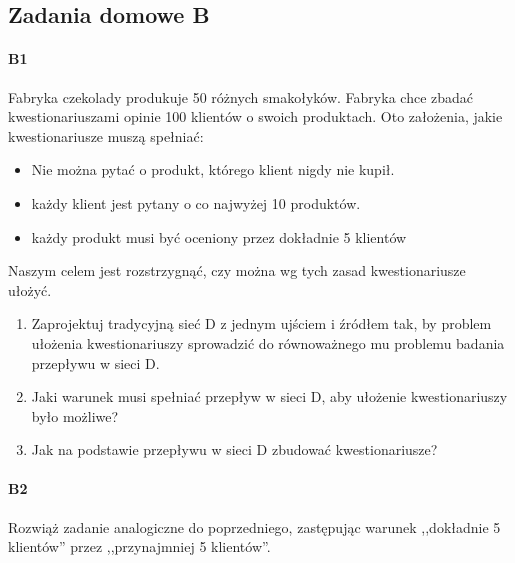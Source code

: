 \subsection{Zadania domowe B}
\paragraph{B1} Fabryka czekolady produkuje 50 różnych smakołyków. Fabryka chce zbadać kwestionariuszami opinie 100 klientów o swoich produktach. Oto założenia, jakie kwestionariusze muszą
spełniać:
\begin{itemize}
\item Nie można pytać o produkt, którego klient nigdy nie kupił.
\item każdy klient jest pytany o co najwyżej 10 produktów.
\item każdy produkt musi być oceniony przez dokładnie 5 klientów
\end{itemize}
Naszym celem jest rozstrzygnąć, czy można wg tych zasad kwestionariusze ułożyć.
\begin{enumerate}[label=\alph*)]
\item Zaprojektuj tradycyjną sieć D z jednym ujściem i źródłem tak, by problem ułożenia kwestionariuszy
sprowadzić do równoważnego mu problemu badania przepływu w sieci D.
\item Jaki warunek musi spełniać przepływ w sieci D, aby ułożenie kwestionariuszy było możliwe?
\item Jak na podstawie przepływu w sieci D zbudować kwestionariusze?
\end{enumerate}

\paragraph{B2} Rozwiąż zadanie analogiczne do poprzedniego, zastępując warunek ,,dokładnie 5 klientów'' przez ,,przynajmniej 5 klientów''.

